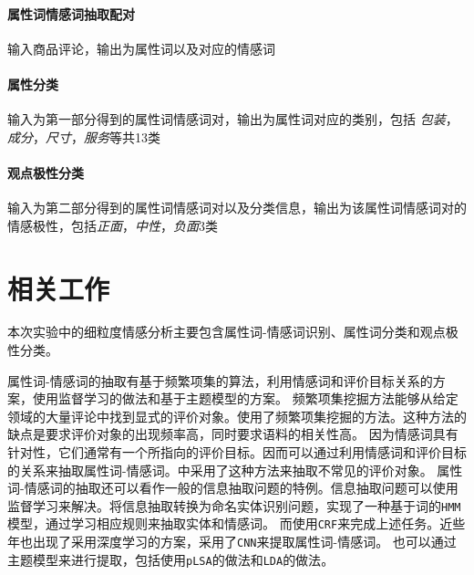 \documentclass[11pt,a4paper]{article}
\begin{document}
\paragraph{属性词情感词抽取配对} 输入商品评论，输出为属性词以及对应的情感词
\paragraph{属性分类} 输入为第一部分得到的属性词情感词对，输出为属性词对应的类别，包括 \textit{包装}，\textit{成分}，\textit{尺寸}，\textit{服务}等共13类
\paragraph{观点极性分类} 输入为第二部分得到的属性词情感词对以及分类信息，输出为该属性词情感词对的情感极性，包括\textit{正面}，\textit{中性}，\textit{负面}3类



\section{相关工作}
本次实验中的细粒度情感分析主要包含属性词-情感词识别、属性词分类和观点极性分类。

属性词-情感词的抽取有基于频繁项集的算法，利用情感词和评价目标关系的方案，使用监督学习的做法和基于主题模型的方案。
频繁项集挖掘方法能够从给定领域的大量评论中找到显式的评价对象。\cite{hu2004mining}使用了频繁项集挖掘的方法。这种方法的缺点是要求评价对象的出现频率高，同时要求语料的相关性高。
因为情感词具有针对性，它们通常有一个所指向的评价目标。因而可以通过利用情感词和评价目标的关系来抽取属性词-情感词。\cite{hu2004mining}中采用了这种方法来抽取不常见的评价对象。
属性词-情感词的抽取还可以看作一般的信息抽取问题的特例。信息抽取问题可以使用监督学习来解决。将信息抽取转换为命名实体识别问题，\cite{jin2009novel}实现了一种基于词的\texttt{HMM}模型，通过学习相应规则来抽取实体和情感词。
而\cite{jakob2010extracting}使用\texttt{CRF}来完成上述任务。近些年也出现了采用深度学习的方案，\cite{wang2015deep}采用了\texttt{CNN}来提取属性词-情感词。
也可以通过主题模型来进行提取，包括使用\texttt{pLSA}\cite{hofmann1999probabilistic}的做法和\texttt{LDA}的做法\cite{steyvers2007probabilistic}。
\end{document}
